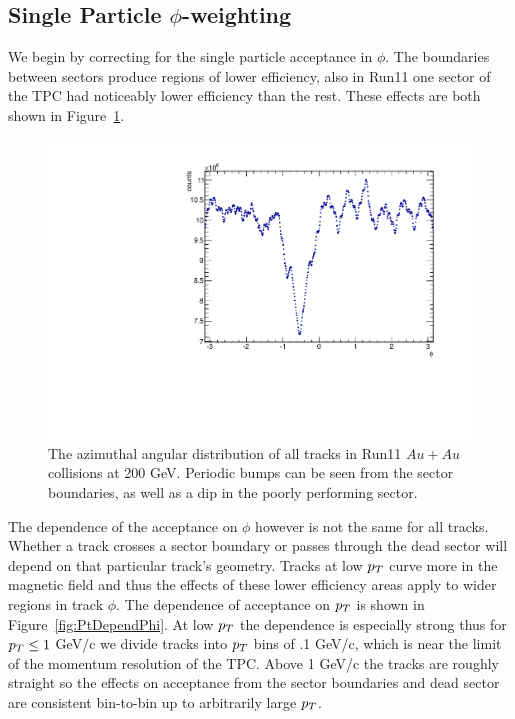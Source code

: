 \subsection{Single Particle $\phi$-weighting}

We begin by correcting for the single particle acceptance in $\phi$. The boundaries between sectors produce regions of lower efficiency, also in Run11 one sector of the TPC had noticeably lower efficiency than the rest. These effects are both shown in Figure~\ref{fig:PhiDistAllTracks}.  

\begin{figure}[htbp]
\begin{center}
\includegraphics[scale=.75]{Plots/Correlations/Phi_All.pdf}
\end{center}
\caption[Phi distribution for all tracks in TPC.]{The azimuthal angular distribution of all tracks in Run11 $Au+Au$ collisions at 200 GeV. Periodic bumps can be seen from the sector boundaries, as well as a dip in the poorly performing sector.}
\label{fig:PhiDistAllTracks}
\end{figure}

The dependence of the acceptance on $\phi$ however is not the same for all tracks. Whether a track crosses a sector boundary or passes through the dead sector will depend on that particular track's geometry. Tracks at low $p_{T}$ curve more in the magnetic field and thus the effects of these lower efficiency areas apply to wider regions in track $\phi$. The dependence of acceptance on $p_{T}$ is shown in Figure~\ref{fig:PtDependPhi}. At low $p_{T}$ the dependence is especially strong thus for $p_{T} \leq 1$ GeV/c we divide tracks into $p_{T}$ bins of .1 GeV/c, which is near the limit of the momentum resolution of the TPC. Above 1 GeV/c the tracks are roughly straight so the effects on acceptance from the sector boundaries and dead sector are consistent bin-to-bin up to arbitrarily large $p_{T}$.


